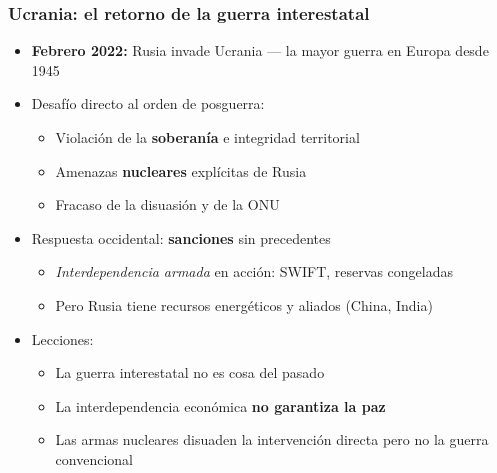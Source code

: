 \begin{frame}
\frametitle{Ucrania: el retorno de la guerra interestatal}
\centering

\begin{itemize}
  \item \textbf{Febrero 2022:} Rusia invade Ucrania --- la mayor guerra en Europa desde 1945
  \vspace{6pt}
  \item<2-> Desafío directo al orden de posguerra:
  \begin{itemize}
    \item Violación de la \textbf{soberanía} e integridad territorial
    \item Amenazas \textbf{nucleares} explícitas de Rusia
    \item Fracaso de la disuasión y de la ONU
  \end{itemize}
  \vspace{6pt}
  \item<3-> Respuesta occidental: \textbf{sanciones} sin precedentes
  \begin{itemize}
    \item \textit{Interdependencia armada} en acción: SWIFT, reservas congeladas
    \item Pero Rusia tiene recursos energéticos y aliados (China, India)
  \end{itemize}
  \vspace{6pt}
  \item<4-> Lecciones:
  \begin{itemize}
    \item La guerra interestatal \alert{no es cosa del pasado}
    \item La interdependencia económica \textbf{no garantiza la paz}
    \item Las armas nucleares disuaden la intervención directa pero no la guerra convencional
  \end{itemize}
\end{itemize}

\end{frame}
